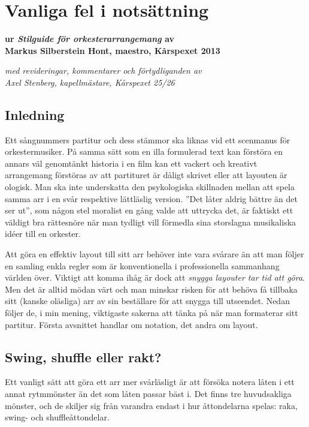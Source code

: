 \chapter{Vanliga fel i notsättning}
\begin{centering}
\textbf{ur \textit{Stilguide för orkesterarrangemang} av \\ Markus Silberstein Hont, maestro, Kårspexet 2013}

\textit{med revideringar, kommentarer och förtydliganden av \\ Axel Stenberg, kapellmästare, Kårspexet 25/26}

\vspace{1em}
\end{centering}

\section{Inledning}
Ett sångnummers partitur och dess stämmor ska liknas vid ett scenmanus för orkestermusiker. På samma sätt som en illa formulerad text kan förstöra en annars väl genomtänkt historia i en film kan ett vackert och kreativt arrangemang förstöras av att partituret är dåligt skrivet eller att layouten är ologisk. Man ska inte underskatta den psykologiska skillnaden mellan att spela samma arr i en svår respektive lättläslig version. ''Det låter aldrig bättre än det ser ut'', som någon stel moralist en gång valde att uttrycka det, är faktiskt ett väldigt bra rättesnöre när man tydligt vill förmedla sina storslagna musikaliska idéer till en orkester. 

Att göra en effektiv layout till sitt arr behöver inte vara svårare än att man följer en samling enkla regler som är konventionella i	professionella sammanhang världen över. Viktigt att komma ihåg är dock att \textit{snygga layouter tar tid att göra}. Men det är alltid mödan värt och man minskar risken för att behöva få tillbaka sitt (kanske oläsliga) arr av sin beställare för att snygga till utseendet. Nedan följer de, i min mening, viktigaste sakerna att tänka på när man formaterar sitt partitur. Första avsnittet handlar om notation, det andra om layout.

\newpage
\section{Swing, shuffle eller rakt?}
Ett vanligt sätt att göra ett arr mer svårläsligt är att försöka notera låten i ett annat rytmmönster än det som låten passar bäst i. Det finns tre huvudsakliga mönster, och de skiljer sig från varandra endast i hur åttondelarna spelas: raka, swing- och shuffleåttondelar.

